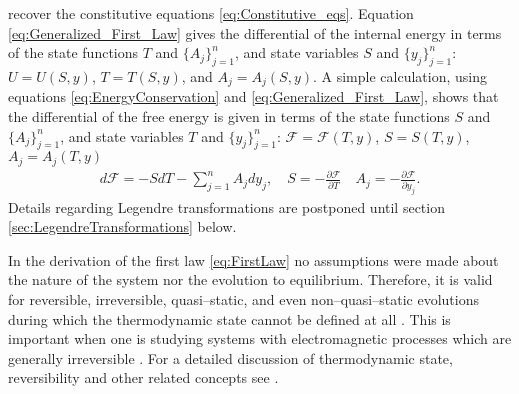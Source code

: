 \documentclass[english,12pt]{ttuthes}
\newcommand{\Fc}{\mathcal{F}}
\begin{document}
recover the constitutive equations \eqref{eq:Constitutive_eqs}.
Equation \eqref{eq:Generalized_First_Law} gives the differential of
the internal energy in terms of the state functions $T$ and
$\{A_j\}_{j=1}^n$, and state variables $S$ and $\{y_j\}_{j=1}^n$:
$U=U(S,y)$, $T=T(S,y)$, and $A_j=A_j(S,y)$. A simple calculation,
using equations \eqref{eq:EnergyConservation} and
\eqref{eq:Generalized_First_Law}, shows that the differential of the
free energy is given in terms of the state functions $S$ and
$\{A_j\}_{j=1}^n$, and state variables $T$ and $\{y_j\}_{j=1}^n$:
$\Fc=\Fc(T,y)$, $S=S(T,y)$, $A_j=A_j(T,y)$
\cite{Robertson-1993}  
%
\begin{align}\label{eq:Helmholtz_first_law}
  d\Fc=-SdT-\sum_{j=1}^nA_jdy_j, \quad
  S=-\frac{\partial\Fc}{\partial T} \quad
  A_j=-\frac{\partial\Fc}{\partial y_j}.
\end{align}
%
Details regarding Legendre transformations are postponed until section
\ref{sec:LegendreTransformations} below.    

In the derivation of the first law \eqref{eq:FirstLaw} no assumptions
were made about the nature of the system nor the evolution to equilibrium. 
Therefore, it is valid for reversible, irreversible, quasi--static,
and even non--quasi--static evolutions during which the thermodynamic
state cannot be defined at all \cite{Bobbio-2000}. This is important when
one is studying systems with electromagnetic processes which are
generally irreversible \cite{Bobbio-2000}. For a detailed
discussion of thermodynamic state, reversibility and other related
concepts see \cite{Bobbio-2000,Thompson-1988,Robertson-1993}. 
\end{document}
